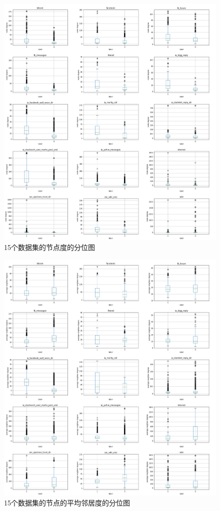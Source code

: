  \begin{figure}[!htbp]
 	\setlength{\abovecaptionskip}{0pt} 
 	\setlength{\belowcaptionskip}{10pt} 
 	\includegraphics[width=.9\textwidth]{figures/chap03/figure/alldata-DG.pdf}
 	\caption{15个数据集的节点度的分位图}
 	\label{fig.3.4}
 \end{figure}

 \begin{figure}[!htbp]
 	\setlength{\abovecaptionskip}{0pt} 
 	\setlength{\belowcaptionskip}{10pt} 
 	\includegraphics[width=.9\textwidth]{figures/chap03/figure/alldata-aND.pdf}
 	\caption{15个数据集的节点的平均邻居度的分位图}
 	\label{fig.3.5}
 \end{figure}



